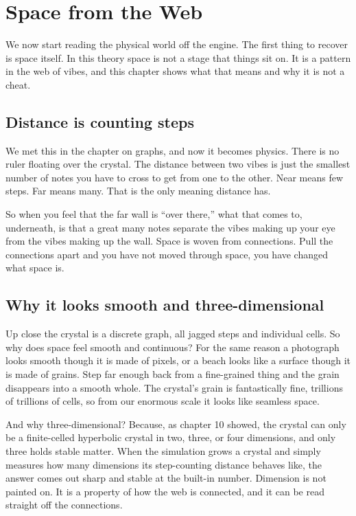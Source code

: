 \section{Space from the Web}

We now start reading the physical world off the engine. The first thing to recover is space itself. In this theory space is not a stage that things sit on. It is a pattern in the web of vibes, and this chapter shows what that means and why it is not a cheat.

\subsection{Distance is counting steps}

We met this in the chapter on graphs, and now it becomes physics. There is no ruler floating over the crystal. The distance between two vibes is just the smallest number of notes you have to cross to get from one to the other. Near means few steps. Far means many. That is the only meaning distance has.

So when you feel that the far wall is ``over there,'' what that comes to, underneath, is that a great many notes separate the vibes making up your eye from the vibes making up the wall. Space is woven from connections. Pull the connections apart and you have not moved through space, you have changed what space is.

\subsection{Why it looks smooth and three-dimensional}

Up close the crystal is a discrete graph, all jagged steps and individual cells. So why does space feel smooth and continuous? For the same reason a photograph looks smooth though it is made of pixels, or a beach looks like a surface though it is made of grains. Step far enough back from a fine-grained thing and the grain disappears into a smooth whole. The crystal's grain is fantastically fine, trillions of trillions of cells, so from our enormous scale it looks like seamless space.

And why three-dimensional? Because, as chapter 10 showed, the crystal can only be a finite-celled hyperbolic crystal in two, three, or four dimensions, and only three holds stable matter. When the simulation grows a crystal and simply measures how many dimensions its step-counting distance behaves like, the answer comes out sharp and stable at the built-in number. Dimension is not painted on. It is a property of how the web is connected, and it can be read straight off the connections.

